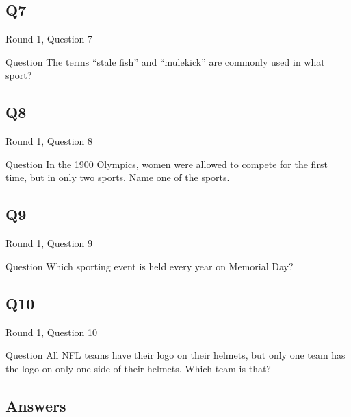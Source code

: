 \documentclass[11pt]{beamer}
\begin{document}
\subsection*{Q7}
\begin{frame}[t]{Round 1, Question 7}
\vspace{0.5em}
\begin{block}{Question}
The terms ``stale fish'' and ``mulekick'' are commonly used in what sport?
\end{block}
\end{frame}
    

\subsection*{Q8}
\begin{frame}[t]{Round 1, Question 8}
\vspace{0.5em}
\begin{block}{Question}
In the 1900 Olympics, women were allowed to compete for the first time, but in only two sports. Name one of the sports.
\end{block}
\end{frame}
    

\subsection*{Q9}
\begin{frame}[t]{Round 1, Question 9}
\vspace{0.5em}
\begin{block}{Question}
Which sporting event is held every year on Memorial Day?
\end{block}
\end{frame}
    

\subsection*{Q10}
\begin{frame}[t]{Round 1, Question 10}
\vspace{0.5em}
\begin{block}{Question}
All NFL teams have their logo on their helmets, but only one team has the logo on only one side of their helmets. Which team is that?
\end{block}
\end{frame}
    
\subsection{Answers}
\end{document}
